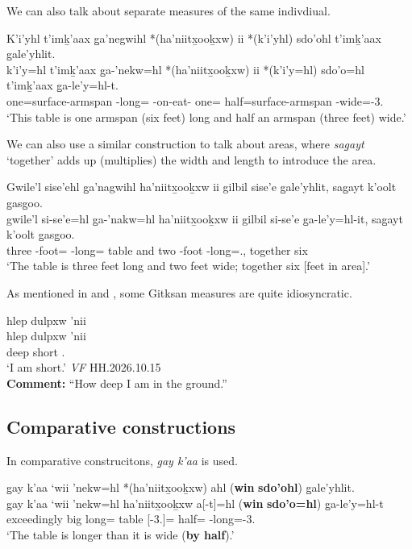\documentclass{article}
\begin{document}
We can also talk about separate measures of the same indivdiual.

\begin{exe}
    \ex \glll
    K’i’yhl t’imḵ’aax g̱a’negwihl *(ha’niitx̱ooḵxw) ii *(k’i’yhl) sdo’ohl t’imḵ’aax g̱ale’yhlit. \\
    k’i’y=hl t’imḵ’aax g̱a-’nekw=hl *(ha’niitx̱ooḵxw) ii *(k’i’y=hl) sdo’o=hl t’imḵ’aax g̱a-le’y=hl-t. \\
    one=\Cn{}surface-armspan \Distr-long=\Cn{} \Ins-on-eat-\Val{} \Ccnj{} one=\Cn{} half=\Cn{}surface-armspan \Distr-wide=\Cn{}-3.\Ii \\
    \glt `This table is one armspan (six feet) long and half an armspan (three feet) wide.'
\end{exe}

We can also use a similar construction to talk about areas, where \textit{sag̱ayt} `together' adds up (multiplies) the width and length to introduce the area.

\begin{exe}
    \ex \glll Gwile'l sise’ehl g̱a’nagwihl ha’niitx̱ooḵxw ii gilbil sise’e   g̱ale’yhlit, sag̱ayt k'oolt g̱asg̱oo. \\
     gwile'l si-se’e=hl g̱a-’nakw=hl ha’niitx̱ooḵxw ii gilbil si-se’e   g̱a-le’y=hl-it, sag̱ayt k'oolt g̱asg̱oo. \\
    three \Pl-foot=\Cn{} \Distr-long=\Cn{} table and two \Pl-foot \Distr-long=.\Ii, together six \Mass \\ 
    \glt `The table is three feet long and two feet wide; together six [feet in area].'
\end{exe}


As mentioned in \textcite{aonukiDifferentialMeasurePhrases2025} and \textcite{davisMorphosyntaxGitksan2026}, some Gitksan measures are quite idiosyncratic. 

\begin{exe}
    \ex \glll hlep dulpxw 'nii \\
    hlep dulpxw 'nii   \\
    deep short \Fsg{}.\Iii{} \\
    `I am short.' \textit{VF} \hfill HH.2026.10.15 \\ 
    \textbf{Comment:} ``How deep I am in the ground.''
\end{exe}


\subsection{Comparative constructions}
In comparative construcitons, \textit{g̱ay k'aa} is used.
\begin{exe}
    \ex \glll g̱ay k’aa ‘wii ’nekw=hl *(ha’niitx̱ooḵxw) ahl (\textbf{win} \textbf{sdo’ohl}) g̱ale’yhlit. \\
    g̱ay k’aa ‘wii ’nekw=hl ha’niitx̱ooḵxw a[-t]=hl (\textbf{win} \textbf{sdo’o=hl}) g̱a-le’y=hl-t \\
    \Cntr{} exceedingly big long=\Cn{} table \Prep{}[-3.\Ii]=\Cn{} \Comp{} half=\Cn{} \Distr-long=\Cn{}-3.\Ii \\ 
    \glt `The table is longer than it is wide (\textbf{by half}).'
\end{exe}
\end{document}
